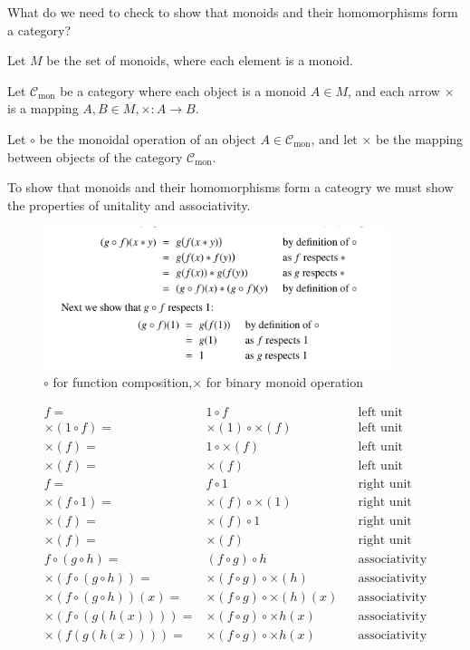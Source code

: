 \begin{ttta}
What do we need to check to show that monoids and their homomorphisms form a
category?
\end{ttta}
\begin{proofitem}
\item Let $M$ be the set of monoids, where each element is a monoid.
\item Let $\mathcal{C}_\text{mon}$ be a category where each object is a monoid
    $A\in M$, and each arrow $\times$ is a mapping $A,B \in M, \times:
    A\rightarrow B$.
\item Let $\circ$ be the monoidal operation of an object
    $A\in\mathcal{C}_\text{mon}$, and let $\times$
    be the mapping between objects of the category $\mathcal{C}_\text{mon}$.
\item To show that monoids and their homomorphisms form a cateogry we must show
    the properties of unitality and associativity.
\begin{figure}
   \centering
   \includegraphics[width=0.9\textwidth]{imgs/13-01-monoid-homomorphism.png}
   \caption{$\circ$ for function composition,$\times$ for binary monoid
   operation}
\end{figure}
\begin{align}
    f =& 1\circ f &&\text{left unit}\\
    \times(1\circ f) =& \times(1) \circ \times(f) &&\text{left unit}\\
    \times(f) =& 1 \circ \times(f) &&\text{left unit}\\
    \times(f) =& \times(f) &&\text{left unit}\\
    f =& f\circ 1 &&\text{right unit}\\
    \times (f\circ 1) =& \times(f) \circ \times(1) &&\text{right unit}\\
    \times (f) =& \times(f) \circ 1 &&\text{right unit}\\
    \times (f) =& \times(f) &&\text{right unit}\\
    f\circ (g\circ h)=& (f\circ g) \circ h &&\text{associativity}\\
    \times(f\circ (g\circ h))=& \times(f\circ g) \circ \times(h) &&\text{associativity}\\
    \times(f\circ (g\circ h))(x)=& \times(f\circ g) \circ \times(h)(x) &&\text{associativity}\\
    \times(f\circ (g(h(x))))=& \times(f\circ g) \circ \times h(x) &&\text{associativity}\\
    \times(f(g(h(x))))=& \times(f\circ g) \circ \times h(x) &&\text{associativity}\\
\end{align}
\end{proofitem}
